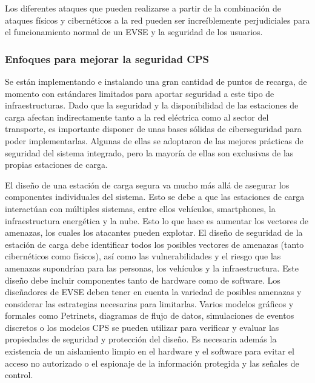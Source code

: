 \documentclass[12pt,a4paper,onecolumn,oneside]{report}
\newcounter{subsubsubsection}[subsubsection]
\begin{document}
Los diferentes ataques que pueden realizarse a partir de la combinación de ataques físicos y cibernéticos a la red pueden ser increíblemente perjudiciales para el funcionamiento normal de un EVSE y la seguridad de los usuarios.


\subsubsection{Enfoques para mejorar la seguridad CPS}
\label{Enfoques para mejorar la seguridad CPS}

Se están implementando e instalando una gran cantidad de puntos de recarga, de momento con estándares limitados para aportar seguridad a este tipo de infraestructuras. Dado que la seguridad y la disponibilidad de las estaciones de carga afectan indirectamente tanto a la red eléctrica como al sector del transporte, es importante disponer de unas bases sólidas de ciberseguridad para poder implementarlas. Algunas de ellas se adoptaron de las mejores prácticas de seguridad del sistema integrado, pero la mayoría de ellas son exclusivas de las propias estaciones de carga.


El diseño de una estación de carga segura va mucho más allá de asegurar los componentes individuales del sistema. Esto se debe a que las estaciones de carga interactúan con múltiples sistemas, entre ellos vehículos, smartphones, la infraestructura energética y la nube. Esto lo que hace es aumentar los vectores de amenazas, los cuales los atacantes pueden explotar. El diseño de seguridad de la estación de carga debe identificar todos los posibles vectores de amenazas (tanto cibernéticos como físicos), así como las vulnerabilidades y el riesgo que las amenazas supondrían para las personas, los vehículos y la infraestructura. Este diseño debe incluir componentes tanto de hardware como de software. Los diseñadores de EVSE deben tener en cuenta la variedad de posibles amenazas y considerar las estrategias necesarias para limitarlas. Varios modelos gráficos y formales como Petrinets, diagramas de flujo de datos, simulaciones de eventos discretos o los modelos CPS \cite{catorce}\cite{quince}\cite{dieciseis}\cite{diecisiete} se pueden utilizar para verificar y evaluar las propiedades de seguridad y protección del diseño. Es necesaria además la existencia de un aislamiento limpio en el hardware y el software para evitar el acceso no autorizado o el espionaje de la información protegida y las señales de control.
\end{document}
